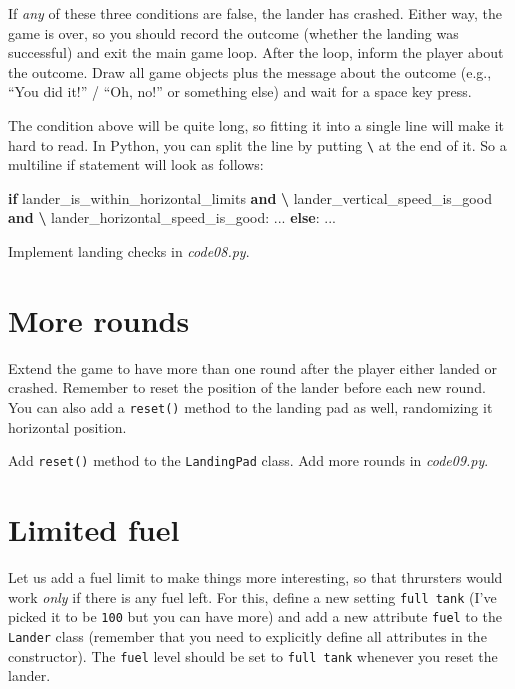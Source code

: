 \documentclass[
]{book}
\newenvironment{Shaded}{\begin{snugshade}}{\end{snugshade}}
\newcommand{\ControlFlowTok}[1]{\textcolor[rgb]{0.13,0.29,0.53}{\textbf{#1}}}
\newcommand{\KeywordTok}[1]{\textcolor[rgb]{0.13,0.29,0.53}{\textbf{#1}}}
\newcommand{\NormalTok}[1]{#1}
\newcommand{\OperatorTok}[1]{\textcolor[rgb]{0.81,0.36,0.00}{\textbf{#1}}}
\begin{document}
If \emph{any} of these three conditions are false, the lander has crashed. Either way, the game is over, so you should record the outcome (whether the landing was successful) and exit the main game loop. After the loop, inform the player about the outcome. Draw all game objects plus the message about the outcome (e.g., ``You did it!'' / ``Oh, no!'' or something else) and wait for a space key press.

The condition above will be quite long, so fitting it into a single line will make it hard to read. In Python, you can split the line by putting \texttt{\textbackslash{}} at the end of it. So a multiline if statement will look as follows:

\begin{Shaded}
\begin{Highlighting}[]
\ControlFlowTok{if}\NormalTok{ lander\_is\_within\_horizontal\_limits }\KeywordTok{and} \OperatorTok{\textbackslash{}}
\NormalTok{   lander\_vertical\_speed\_is\_good }\KeywordTok{and} \OperatorTok{\textbackslash{}}
\NormalTok{   lander\_horizontal\_speed\_is\_good:}
\NormalTok{   ...}
\ControlFlowTok{else}\NormalTok{:}
\NormalTok{  ...}
\end{Highlighting}
\end{Shaded}

Implement landing checks in \emph{code08.py}.

\hypertarget{more-rounds}{%
\section{More rounds}\label{more-rounds}}

Extend the game to have more than one round after the player either landed or crashed. Remember to reset the position of the lander before each new round. You can also add a \texttt{reset()} method to the landing pad as well, randomizing it horizontal position.

Add \texttt{reset()} method to the \texttt{LandingPad} class.
Add more rounds in \emph{code09.py}.

\hypertarget{limited-fuel}{%
\section{Limited fuel}\label{limited-fuel}}

Let us add a fuel limit to make things more interesting, so that thrursters would work \emph{only} if there is any fuel left. For this, define a new setting \texttt{full\ tank} (I've picked it to be \texttt{100} but you can have more) and add a new attribute \texttt{fuel} to the \texttt{Lander} class (remember that you need to explicitly define all attributes in the constructor). The \texttt{fuel} level should be set to \texttt{full\ tank} whenever you reset the lander.
\end{document}
